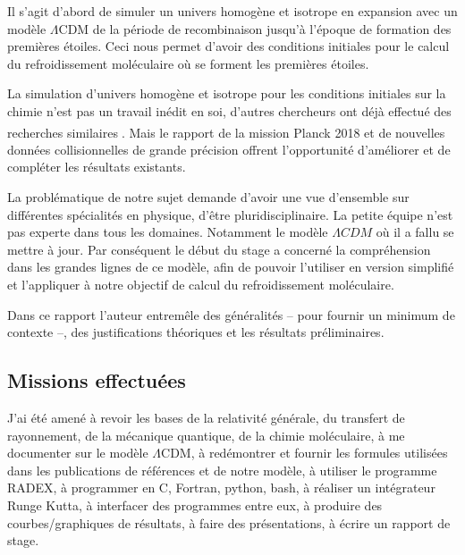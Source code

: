 \documentclass[10pt, a4paper]{report}
\numberwithin{equation}{subsection}
\begin{document}
Il s'agit d'abord de simuler un univers homogène et isotrope en expansion avec un modèle $\Lambda$CDM de la période de recombinaison jusqu'à l'époque de formation des premières étoiles. Ceci nous permet d'avoir des conditions initiales pour le calcul du refroidissement moléculaire où se forment les premières étoiles.

La simulation d'univers homogène et isotrope pour les conditions initiales sur la chimie n'est pas un travail inédit en soi, d'autres chercheurs ont déjà effectué des recherches similaires\textsuperscript{\cite{Coppola} \cite{Flower}}. Mais le rapport de la mission Planck 2018\textsuperscript{\cite{Planck2018}} et de nouvelles données collisionnelles de grande précision offrent l'opportunité d'améliorer et de compléter les résultats existants. 

La problématique de notre sujet demande d'avoir une vue d'ensemble sur différentes spécialités en physique, d'être pluridisciplinaire. La petite équipe n'est pas experte dans tous les domaines. Notamment le modèle $\Lambda CDM$ où il a fallu se mettre à jour. Par conséquent le début du stage a concerné la compréhension dans les grandes lignes de ce modèle, afin de pouvoir l'utiliser en version simplifié et l'appliquer à notre objectif de calcul du refroidissement moléculaire.

Dans ce rapport l'auteur entremêle des généralités -- pour fournir un minimum de contexte --, des justifications théoriques et les résultats préliminaires.


\subsection*{Missions effectuées}

J'ai été amené à revoir les bases de la relativité générale, du transfert de rayonnement, de la mécanique quantique, de la chimie moléculaire, à me documenter sur le modèle $\Lambda$CDM, à redémontrer et fournir les formules utilisées dans les publications de références et de notre modèle, à utiliser le programme RADEX, à programmer en C, Fortran, python, bash, à réaliser un intégrateur Runge Kutta, à interfacer des programmes entre eux, à produire des courbes/graphiques de résultats, à faire des présentations, à écrire un rapport de stage.
\end{document}
